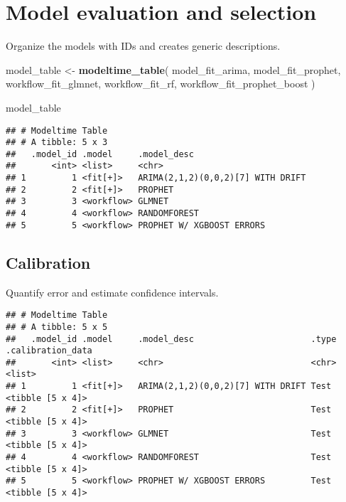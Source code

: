 \documentclass[
]{article}
\newenvironment{Shaded}{\begin{snugshade}}{\end{snugshade}}
\newcommand{\KeywordTok}[1]{\textcolor[rgb]{0.13,0.29,0.53}{\textbf{#1}}}
\newcommand{\NormalTok}[1]{#1}
\newcommand{\OperatorTok}[1]{\textcolor[rgb]{0.81,0.36,0.00}{\textbf{#1}}}
\newcommand{\StringTok}[1]{\textcolor[rgb]{0.31,0.60,0.02}{#1}}
\begin{document}
\hypertarget{model-evaluation-and-selection}{%
\section{Model evaluation and
selection}\label{model-evaluation-and-selection}}

Organize the models with IDs and creates generic descriptions.

\begin{Shaded}
\begin{Highlighting}[]
\NormalTok{model_table <-}\StringTok{ }\KeywordTok{modeltime_table}\NormalTok{(}
\NormalTok{  model_fit_arima, }
\NormalTok{  model_fit_prophet,}
\NormalTok{  workflow_fit_glmnet,}
\NormalTok{  workflow_fit_rf,}
\NormalTok{  workflow_fit_prophet_boost}
\NormalTok{) }

\NormalTok{model_table}
\end{Highlighting}
\end{Shaded}

\begin{verbatim}
## # Modeltime Table
## # A tibble: 5 x 3
##   .model_id .model     .model_desc                      
##       <int> <list>     <chr>                            
## 1         1 <fit[+]>   ARIMA(2,1,2)(0,0,2)[7] WITH DRIFT
## 2         2 <fit[+]>   PROPHET                          
## 3         3 <workflow> GLMNET                           
## 4         4 <workflow> RANDOMFOREST                     
## 5         5 <workflow> PROPHET W/ XGBOOST ERRORS
\end{verbatim}

\hypertarget{calibration}{%
\subsection{Calibration}\label{calibration}}

Quantify error and estimate confidence intervals.

\begin{Shaded}
\end{Shaded}

\begin{verbatim}
## # Modeltime Table
## # A tibble: 5 x 5
##   .model_id .model     .model_desc                       .type .calibration_data
##       <int> <list>     <chr>                             <chr> <list>           
## 1         1 <fit[+]>   ARIMA(2,1,2)(0,0,2)[7] WITH DRIFT Test  <tibble [5 x 4]> 
## 2         2 <fit[+]>   PROPHET                           Test  <tibble [5 x 4]> 
## 3         3 <workflow> GLMNET                            Test  <tibble [5 x 4]> 
## 4         4 <workflow> RANDOMFOREST                      Test  <tibble [5 x 4]> 
## 5         5 <workflow> PROPHET W/ XGBOOST ERRORS         Test  <tibble [5 x 4]>
\end{verbatim}
\end{document}

